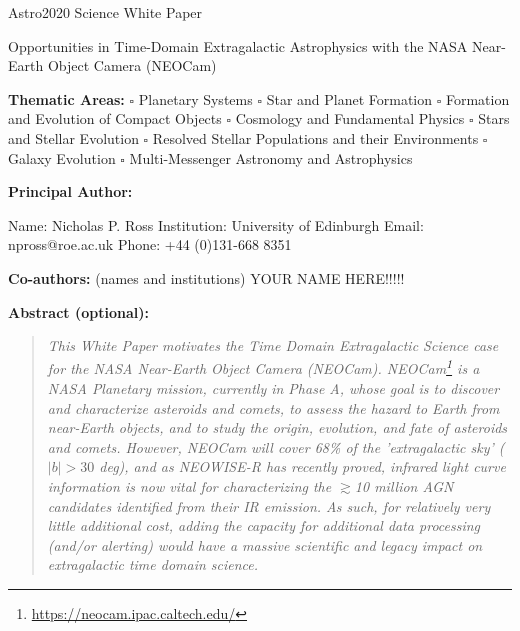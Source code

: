 \documentclass[12pt]{article}
\begin{document}
\raggedright
\huge
Astro2020 Science White Paper \linebreak

Opportunities in Time-Domain Extragalactic Astrophysics with the NASA Near-Earth Object Camera (NEOCam) \linebreak
\normalsize

\noindent \textbf{Thematic Areas:} 
\hspace*{60pt} $\square$ Planetary Systems 
\hspace*{10pt} $\square$ Star and Planet Formation 
\hspace*{20pt} 
\linebreak
$\square$ Formation and Evolution of Compact Objects 
\hspace*{31pt} $\square$ Cosmology and Fundamental Physics 
\linebreak
  $\square$  Stars and Stellar Evolution \hspace*{1pt} 
 $\square$ Resolved Stellar Populations and their Environments \hspace*{40pt} 
\linebreak
  $\square$    Galaxy Evolution   \hspace*{45pt} $\square$             
Multi-Messenger Astronomy and Astrophysics \hspace*{65pt} \linebreak
  
\textbf{Principal Author:}

Name: Nicholas P. Ross	
 \linebreak						
Institution:  University of Edinburgh
 \linebreak
Email: npross@roe.ac.uk
 \linebreak
Phone:  +44 (0)131-668 8351
 \linebreak
 
\textbf{Co-authors:} (names and institutions)
  \linebreak
YOUR NAME HERE!!!!!

\textbf{Abstract  (optional):}


\pagebreak

\begin{quotation}
\noindent
{\it 
This White Paper motivates the {\it Time Domain Extragalactic Science case} for 
the NASA Near-Earth Object Camera (NEOCam). 
NEOCam\footnote{\href{https://neocam.ipac.caltech.edu/}{https://neocam.ipac.caltech.edu/}} is a NASA Planetary mission, currently in Phase A, whose goal is to discover and characterize asteroids and comets, to assess the hazard to Earth from near-Earth objects, and to study the origin, evolution, and fate of asteroids and comets.
However, NEOCam will cover 68\% of the 'extragalactic sky' ($|b| > 30$ deg), 
and as NEOWISE-R has recently proved, infrared light curve information is now vital for characterizing the $\gtrsim$10 million AGN candidates identified from their IR emission. 
As such, for relatively very little additional cost, adding the capacity for additional data processing (and/or alerting) would have a massive scientific and legacy impact on extragalactic time domain science. 
}
\noindent
\end{quotation}
\end{document}
